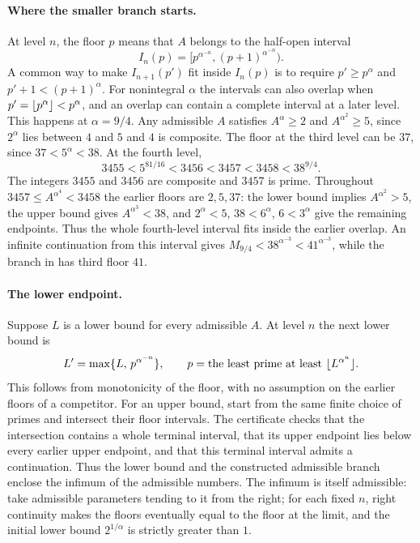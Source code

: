 \paragraph{Where the smaller branch starts.}
At level $n$, the floor $p$ means that $A$ belongs to the half-open interval
\[
 I_n(p)=\bigl[p^{\alpha^{-n}},(p+1)^{\alpha^{-n}}\bigr).
\]
A common way to make $I_{n+1}(p')$ fit inside $I_n(p)$ is to require $p'\ge p^\alpha$
and $p'+1<(p+1)^\alpha$. For nonintegral $\alpha$ the intervals can also overlap when
$p'=\lfloor p^\alpha\rfloor<p^\alpha$, and an overlap can contain a complete interval at a
later level. This happens at $\alpha=9/4$. Any admissible $A$ satisfies $A^\alpha\ge2$
and $A^{\alpha^2}\ge5$, since $2^\alpha$ lies between $4$ and $5$ and $4$ is composite.
The floor at the third level can be $37$, since $37<5^\alpha<38$. At the fourth level,
\[
 3455<5^{81/16}<3456<3457<3458<38^{9/4}.
\]
The integers $3455$ and $3456$ are composite and $3457$ is prime. Throughout
$3457\le A^{\alpha^4}<3458$ the earlier floors are $2,5,37$: the lower bound implies
$A^{\alpha^2}>5$, the upper bound gives $A^{\alpha^3}<38$, and
$2^\alpha<5$, $38<6^\alpha$, $6<3^\alpha$ give the remaining endpoints. Thus the whole
fourth-level interval fits inside the earlier overlap. An infinite continuation from
this interval gives $M_{9/4}<38^{\alpha^{-3}}<41^{\alpha^{-3}}$, while the branch in
\cite[Example~5.2]{ChamberlandStraub2026Prime} has third floor $41$.

\paragraph{The lower endpoint.}
Suppose $L$ is a lower bound for every admissible $A$. At level $n$ the next lower
bound is
\[
 L'=\max\{L,\,p^{\alpha^{-n}}\},\qquad
 p=\text{the least prime at least }\lfloor L^{\alpha^n}\rfloor .
\]
This follows from monotonicity of the floor, with no assumption on the earlier floors
of a competitor. For an upper bound, start from the same finite choice of primes and
intersect their floor intervals. The certificate checks that the intersection contains
a whole terminal interval, that its upper endpoint lies below every earlier upper
endpoint, and that this terminal interval admits a continuation. Thus the lower bound
and the constructed admissible branch enclose the infimum of the admissible numbers.
The infimum is itself admissible: take admissible parameters tending to it from the
right; for each fixed $n$, right continuity makes the floors eventually equal to the
floor at the limit, and the initial lower bound $2^{1/\alpha}$ is strictly greater
than $1$.

